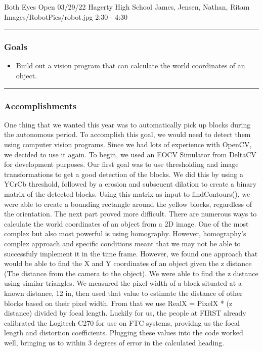 \insertmeeting 
	{Both Eyes Open} 
	{03/29/22} 
	{Hagerty High School}
	{James, Jensen, Nathan, Ritam}
	{Images/RobotPics/robot.jpg}
	{2:30 - 4:30}
	
\noindent\hfil\rule{\textwidth}{.4pt}\hfil
\subsubsection*{Goals}
\begin{itemize}
    \item Build out a vision program that can calculate the world coordinates of an object. 

\end{itemize} 

\noindent\hfil\rule{\textwidth}{.4pt}\hfil

\subsubsection*{Accomplishments}
One thing that we wanted this year was to automatically pick up blocks during the autonomous period. To accomplish this goal, we would need to detect them using computer vision programs. Since we had lots of experience with OpenCV, we decided to use it again. To begin, we used an EOCV Simulator from DeltaCV for development purposes. Our first goal was to use thresholding and image transformations to get a good detection of the blocks. We did this by using a YCrCb threshold, followed by a erosion and subseuent dilation to create a binary matrix of the detected blocks. Using this matrix as input to findContours(), we were able to create a bounding rectangle around the yellow blocks, regardless of the orientation. The next part proved more difficult. There are numerous ways to calculate the world coordinates of an object from a 2D image. One of the most complex but also most powerful is using homography. However, homography's complex approach and specific conditions meant that we may not be able to successfuly implement it in the time frame. However, we found one approach that would be able to find the X and Y coordinates of an object given the z distance (The distance from the camera to the object). We were able to find the z distance using similar triangles. We measured the pixel width of a block situated at a known distance, 12 in, then used that value to estimate the distance of other blocks based on their pixel width. From that we use RealX = PixelX * (z distance) divided by focal length. Luckily for us, the people at FIRST already calibrated the Logitech C270 for use on FTC systems, providng us the focal length and distortion coefficients. Plugging these values into the code worked well, bringing us to within 3 degrees of error in the calculated heading. 


